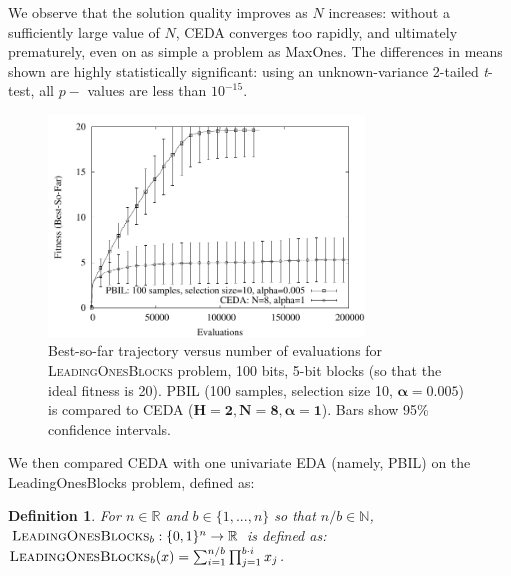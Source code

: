 \documentclass{sig-alt-full}
\newtheorem{defn}{Definition}
\begin{document}
We observe that the solution quality improves as \(N\) increases: without a sufficiently large value of \(N\), CEDA converges too rapidly, and ultimately prematurely, even on as simple a problem as {\sc MaxOnes}.  The differences in means shown are highly statistically significant: using an unknown-variance 2-tailed {\it t}-test, all \(p-\) values are less than \(10^{-15}\).

\begin{figure}[t]
\begin{center}
\includegraphics[width=3.3in]{lobproblem_pbil_vs_cmla_8_alpha_1_evals}
\end{center}
\caption{Best-so-far trajectory versus number of evaluations for
\textsc{LeadingOnesBlocks} problem, 100 bits, 5-bit blocks (so that the ideal fitness is 20). PBIL (100 samples, selection size 10, \(\bm{\alpha=0.005}\)) is compared to CEDA (\(\bm{H=2, N=8, \alpha=1}\)). Bars show 95\% confidence intervals.}
\label{fig:lobproblem_pbil_vs_cmla_8_alpha_1_evals}
\vspace{-0.5em}
\end{figure}

We then compared CEDA with one univariate EDA (namely, PBIL) on the {\sc LeadingOnesBlocks} problem, defined as:

\begin{defn}{For $n \in \mathbb{R}$ and $b \in \{1,...,n\}$ so that $n/b \in \mathbb{N}$, $\textsc{LeadingOnesBlocks}_b: \{0,1\}^n \rightarrow \mathbb{R}$ is defined as:} \(\textsc{LeadingOnesBlocks}_b(x) = \sum_{i=1}^{n/b} \prod_{j=1}^{b \cdot i} x_j \)\quad .\end{defn}
\end{document}
